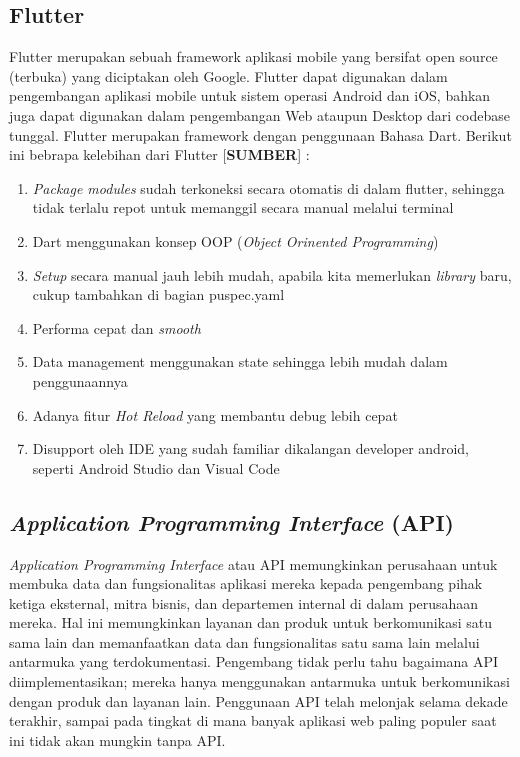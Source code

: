 \begin{flushleft}
\begin{justify}
        \subsection{Flutter}
        Flutter merupakan sebuah framework aplikasi mobile yang bersifat open source (terbuka) yang diciptakan oleh Google. Flutter dapat digunakan dalam pengembangan aplikasi mobile untuk sistem operasi Android dan iOS, bahkan juga dapat digunakan dalam pengembangan Web ataupun Desktop dari codebase tunggal. Flutter merupakan framework dengan penggunaan Bahasa Dart.
Berikut ini bebrapa kelebihan dari Flutter [\textbf{SUMBER}] :
\begin{enumerate}
    \item \textit{Package modules} sudah terkoneksi secara otomatis di dalam flutter, sehingga tidak terlalu repot untuk memanggil secara manual melalui terminal
    \item Dart menggunakan konsep OOP (\textit{Object Orinented Programming})
    \item \textit{Setup} secara manual jauh lebih mudah, apabila kita memerlukan \textit{library} baru, cukup tambahkan di bagian puspec.yaml
    \item Performa cepat dan  \textit{smooth}
    \item Data management menggunakan state sehingga lebih mudah dalam penggunaannya
    \item Adanya fitur \textit{Hot Reload} yang membantu debug lebih cepat
    \item Disupport oleh IDE yang sudah familiar dikalangan developer android, seperti Android Studio dan Visual Code\\
    
\end{enumerate}


        \subsection{\textit{Application Programming Interface} (API)}
            \textit{Application Programming Interface} atau API memungkinkan perusahaan untuk membuka data dan fungsionalitas aplikasi mereka kepada pengembang pihak ketiga eksternal, mitra bisnis, dan departemen internal di dalam perusahaan mereka. Hal ini memungkinkan layanan dan produk untuk berkomunikasi satu sama lain dan memanfaatkan data dan fungsionalitas satu sama lain melalui antarmuka yang terdokumentasi. Pengembang tidak perlu tahu bagaimana API diimplementasikan; mereka hanya menggunakan antarmuka untuk berkomunikasi dengan produk dan layanan lain. Penggunaan API telah melonjak selama dekade terakhir, sampai pada tingkat di mana banyak aplikasi web paling populer saat ini tidak akan mungkin tanpa API.



\end{justify}
\end{flushleft}

